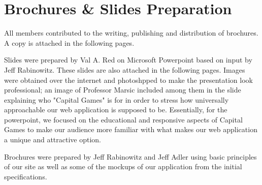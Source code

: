 \chapter{Brochures \& Slides Preparation}

All members contributed to the writing, publishing and distribution of brochures. A copy is attached in the following pages. 

Slides were prepared by Val A. Red on Microsoft Powerpoint based on input by Jeff Rabinowitz. These slides are also attached in the following pages. Images were obtained over the internet and photoshpped to make the presentation look professional; an image of Professor Marsic included among them in the slide explaining who "Capital Games" is for in order to stress how universally approachable our web application is supposed to be. Essentially, for the powerpoint, we focused on the educational and responsive aspects of Capital Games to make our audience more familiar with what makes our web application a unique and attractive option. 

Brochures were prepared by Jeff Rabinowitz and Jeff Adler using basic principles of our site as well as some of the mockups of our application from the initial specifications.